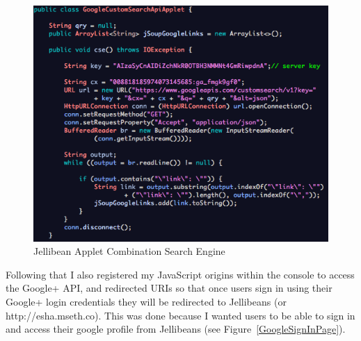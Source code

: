 \documentclass[a4paper, 11pt]{article}
\begin{document}
\begin{figure}[H]
\begin{center}
\includegraphics[scale=0.7]{JBeanAppletGoogleCustomSearch}
\end{center}

\caption{Jellibean Applet Combination Search Engine}
\label{JBeanAppletGoogleCustomSearch1}
\end{figure}

Following that I also registered my JavaScript origins within the console to access the Google+ API, and redirected URIs so that once users sign in using their Google+ login credentials they will be redirected to Jellibeans (or http://esha.mseth.co). This was done because I wanted users to be able to sign in and access their google profile from Jellibeans (see Figure~\ref{GoogleSignInPage}). 
\end{document}
